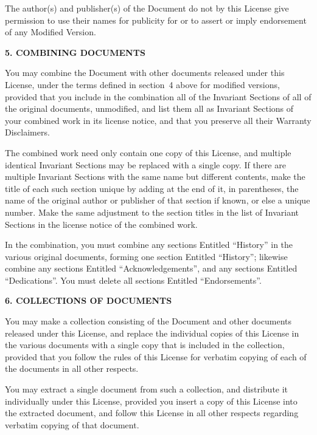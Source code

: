 \documentclass[]{report}
\theoremstyle{definition}
\theoremstyle{remark}
\theoremstyle{plain}
\numberwithin{equation}{chapter}
\begin{document}
\begin{multicols*}{2}
The author(s) and publisher(s) of the Document do not by this License
give permission to use their names for publicity for or to assert or
imply endorsement of any Modified Version.


\begin{center}
	{\footnotesize\bf 5. COMBINING DOCUMENTS\par}
\end{center}


You may combine the Document with other documents released under this
License, under the terms defined in section~4 above for modified
versions, provided that you include in the combination all of the
Invariant Sections of all of the original documents, unmodified, and
list them all as Invariant Sections of your combined work in its
license notice, and that you preserve all their Warranty Disclaimers.

The combined work need only contain one copy of this License, and
multiple identical Invariant Sections may be replaced with a single
copy.  If there are multiple Invariant Sections with the same name but
different contents, make the title of each such section unique by
adding at the end of it, in parentheses, the name of the original
author or publisher of that section if known, or else a unique number.
Make the same adjustment to the section titles in the list of
Invariant Sections in the license notice of the combined work.

In the combination, you must combine any sections Entitled ``History''
in the various original documents, forming one section Entitled
``History''; likewise combine any sections Entitled ``Acknowledgements'',
and any sections Entitled ``Dedications''.  You must delete all sections
Entitled ``Endorsements''.

\begin{center}
	{\footnotesize\bf 6. COLLECTIONS OF DOCUMENTS\par}
\end{center}

You may make a collection consisting of the Document and other documents
released under this License, and replace the individual copies of this
License in the various documents with a single copy that is included in
the collection, provided that you follow the rules of this License for
verbatim copying of each of the documents in all other respects.

You may extract a single document from such a collection, and distribute
it individually under this License, provided you insert a copy of this
License into the extracted document, and follow this License in all
other respects regarding verbatim copying of that document.



\end{multicols*}
\end{document}
